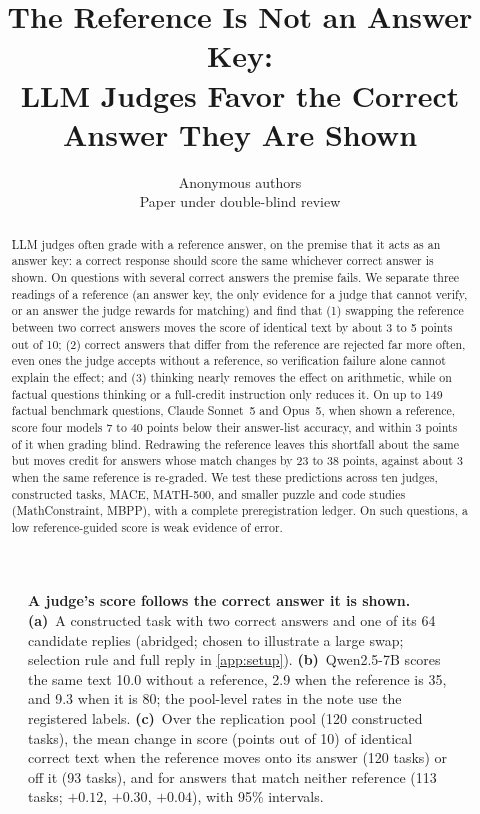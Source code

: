 \documentclass{article}
\title{The Reference Is Not an Answer Key:\\LLM Judges Favor the Correct Answer They Are Shown}
\author{Anonymous authors\\Paper under double-blind review}
\begin{document}
\maketitle

\begin{abstract}
LLM judges often grade with a reference answer, on the premise that it acts as an answer key: a correct response should score the same whichever correct answer is shown.
On questions with several correct answers the premise fails.
We separate three readings of a reference (an answer key, the only evidence for a judge that cannot verify, or an answer the judge rewards for matching) and find that (1) swapping the reference between two correct answers moves the score of identical text by about 3 to 5 points out of 10; (2) correct answers that differ from the reference are rejected far more often, even ones the judge accepts without a reference, so verification failure alone cannot explain the effect; and (3) thinking nearly removes the effect on arithmetic, while on factual questions thinking or a full-credit instruction only reduces it.
On up to 149 factual benchmark questions, Claude Sonnet~5 and Opus~5, when shown a reference, score four models 7 to 40 points below their answer-list accuracy, and within 3 points of it when grading blind.
Redrawing the reference leaves this shortfall about the same but moves credit for answers whose match changes by 23 to 38 points, against about 3 when the same reference is re-graded.
We test these predictions across ten judges, constructed tasks, MACE, MATH-500, and smaller puzzle and code studies (MathConstraint, MBPP), with a complete preregistration ledger.
On such questions, a low reference-guided score is weak evidence of error.
\end{abstract}

\begin{figure}[!b]
\centering
\resizebox{\textwidth}{!}{}
\caption{\textbf{A judge's score follows the correct answer it is shown.}
\textbf{(a)}~A constructed task with two correct answers and one of its 64 candidate replies (abridged; chosen to illustrate a large swap; selection rule and full reply in \cref{app:setup}).
\textbf{(b)}~Qwen2.5-7B scores the same text 10.0 without a reference, 2.9 when the reference is 35, and 9.3 when it is 80; the pool-level rates in the note use the registered labels.
\textbf{(c)}~Over the replication pool (120 constructed tasks), the mean change in score (points out of 10) of identical correct text when the reference moves onto its answer (120 tasks) or off it (93 tasks), and for answers that match neither reference (113 tasks; $+0.12$, $+0.30$, $+0.04$), with 95\% intervals.}
\label{fig:concept}
\end{figure}
\end{document}
